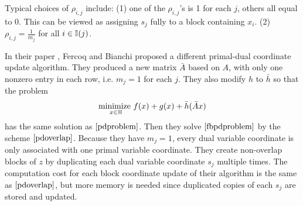 {{{Typical choices of $\rho_{i,j}$ include: (1) one of the $\rho_{i,j}$'s is 1 for each $j$, others all equal to 0. This can be viewed as assigning $s_j$ fully to a block containing $x_i$.
(2) $\rho_{i,j}=\frac{1}{m_j}$ for all $i\in\mathbb{I}(j)$.

\begin{remark}
In their paper \cite{fercoq2015coordinate}, Fercoq and Bianchi proposed a different primal-dual coordinate update algorithm. 
They produced a new matrix $\bar{A}$ based on $A$, with only one nonzero entry in each row, i.e. $m_j=1$ for each $j$. They also modify $h$ to $\bar{h}$ so that the problem
\begin{equation}
\underset{x\in\mathbb{H}}{\textnormal{minimize }} f(x)+g(x)+\bar{h}(\bar{A}x)\label{fbpdproblem}
\end{equation}
has the same solution as $\eqref{pdproblem}$. Then they solve $\eqref{fbpdproblem}$ by the scheme $\eqref{pdoverlap}$. Because they have $m_j=1$, every dual variable coordinate is only associated with one primal variable coordinate. 
They create non-overlap blocks of $z$ by duplicating each dual variable coordinate $s_j$ multiple times. The computation cost for each block coordinate update of their algorithm is the same as $\eqref{pdoverlap}$, but more memory is needed since duplicated copies of each $s_j$ are stored and updated.
\end{remark}

}}}

